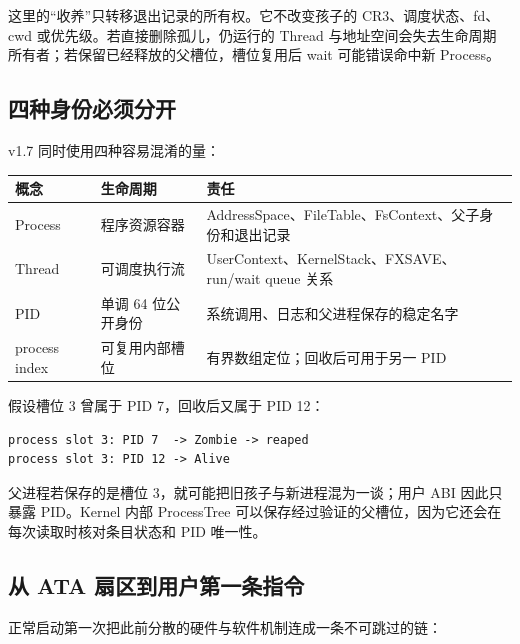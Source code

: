 这里的“收养”只转移退出记录的所有权。它不改变孩子的 CR3、调度状态、fd、
cwd 或优先级。若直接删除孤儿，仍运行的 Thread 与地址空间会失去生命周期
所有者；若保留已经释放的父槽位，槽位复用后 wait 可能错误命中新 Process。

\subsection{四种身份必须分开}

v1.7 同时使用四种容易混淆的量：

\begin{longtable}{L{0.18\textwidth}L{0.23\textwidth}L{0.48\textwidth}}
\toprule
概念 & 生命周期 & 责任\\
\midrule
Process & 程序资源容器 & AddressSpace、FileTable、FsContext、父子身份和退出记录\\
Thread & 可调度执行流 & UserContext、KernelStack、FXSAVE、run/wait queue 关系\\
PID & 单调 64 位公开身份 & 系统调用、日志和父进程保存的稳定名字\\
process index & 可复用内部槽位 & 有界数组定位；回收后可用于另一 PID\\
\bottomrule
\end{longtable}

假设槽位 3 曾属于 PID 7，回收后又属于 PID 12：

\begin{lstlisting}[caption={槽位复用不能等同于身份复用}]
process slot 3: PID 7  -> Zombie -> reaped
process slot 3: PID 12 -> Alive
\end{lstlisting}

父进程若保存的是槽位 3，就可能把旧孩子与新进程混为一谈；用户 ABI 因此只
暴露 PID。Kernel 内部 ProcessTree 可以保存经过验证的父槽位，因为它还会在
每次读取时核对条目状态和 PID 唯一性。

\subsection{从 ATA 扇区到用户第一条指令}

正常启动第一次把此前分散的硬件与软件机制连成一条不可跳过的链：

